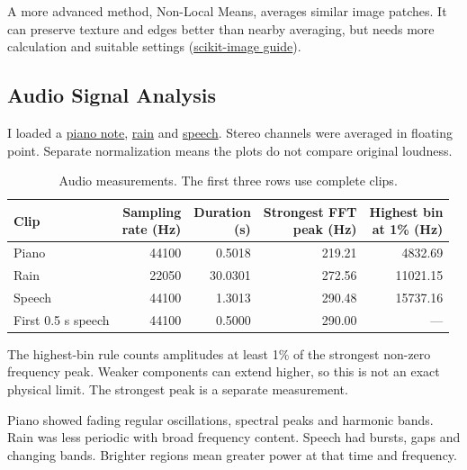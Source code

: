 \documentclass[11pt,a4paper]{article}
\begin{document}
A more advanced method, Non-Local Means, averages similar image patches.
It can preserve texture and edges better than nearby averaging, but needs more
calculation and suitable settings
(\href{https://scikit-image.org/docs/stable/auto_examples/filters/plot_nonlocal_means.html}{scikit-image guide}).

\subsection{Audio Signal Analysis}
I loaded a
\href{https://raw.githubusercontent.com/parisjava/wav-piano-sound/master/wav/a1.wav}{piano note},
\href{https://www.pacdv.com/sounds/ambience_sounds/rain_2.wav}{rain} and
\href{https://www.pacdv.com/sounds/voices/can-you-keep-a-secret.wav}{speech}.
Stereo channels were averaged in floating point. Separate normalization means
the plots do not compare original loudness.

\begin{table}[!htbp]
\centering
\caption{Audio measurements. The first three rows use complete clips.}
\label{tab:audio}
\small
\begin{tabular}{lrrrr}
\toprule
Clip & \shortstack{Sampling\\rate (Hz)} & \shortstack{Duration\\(s)} &
\shortstack{Strongest FFT\\peak (Hz)} & \shortstack{Highest bin\\at 1\% (Hz)}\\
\midrule
Piano & 44100 & 0.5018 & 219.21 & 4832.69\\
Rain & 22050 & 30.0301 & 272.56 & 11021.15\\
Speech & 44100 & 1.3013 & 290.48 & 15737.16\\
First 0.5 s speech & 44100 & 0.5000 & 290.00 & ---\\
\bottomrule
\end{tabular}
\end{table}

The highest-bin rule counts amplitudes at least 1\% of the strongest non-zero
frequency peak. Weaker components can extend higher, so this is not an exact
physical limit. The strongest peak is a separate measurement.

Piano showed fading regular oscillations, spectral peaks and harmonic bands.
Rain was less periodic with broad frequency content. Speech had bursts, gaps
and changing bands. Brighter regions mean greater power at that time and
frequency.
\end{document}
